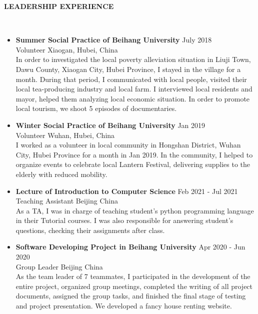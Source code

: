 \documentclass[10pt,article]{article}
\newcommand{\resheading}[1]{%
  {\small\colorbox{mygrey}{%
    \begin{minipage}{0.97\textwidth}\centering\textbf{#1 \vphantom{p\^{E}}}\end{minipage}%
  }}%
}
\begin{document}
\resheading{\textbf{LEADERSHIP EXPERIENCE}}\\
\begin{itemize}
  \item \textbf{Summer Social Practice of Beihang University} \hfill July 2018 \\
  Volunteer \hfill Xiaogan, Hubei, China \\
   In order to investigated the local poverty alleviation situation in Liuji Town, Dawu County, Xiaogan City, Hubei Province, I stayed in the village for a month. During that period, I communicated with local people, visited their local tea-producing industry and local farm. I interviewed local residents and mayor, helped them analyzing local economic situation. In order to promote local tourism, we shoot 5 episodes of documentaries.
  
  \item \textbf{Winter Social Practice of Beihang University} \hfill Jan 2019 \\
   Volunteer \hfill Wuhan, Hubei, China \\
   I worked as a volunteer in local community in Hongshan District, Wuhan City, Hubei Province for a month in Jan 2019. In the community, I helped to organize events to celebrate local Lantern Festival, delivering supplies to the elderly with reduced mobility.

   \item \textbf{Lecture of Introduction to Computer Science} \hfill Feb 2021 - Jul 2021 \\
   Teaching Assistant \hfill Beijing China \\
   As a TA, I was in charge of teaching student's python programming language in their Tutorial courses. I was also responsible for answering student's questions, checking their assignments after class.

   \item \textbf{Software Developing Project in Beihang University} \hfill Apr 2020 - Jun 2020 \\
   Group Leader \hfill Beijing China \\
   As the team leader of 7 teammates, I participated in the development of the entire project, organized group meetings, completed the writing of all project documents, assigned the group tasks, and finished the final stage of testing and project presentation. We developed a fancy house renting website.
   
\end{itemize}
\end{document}
